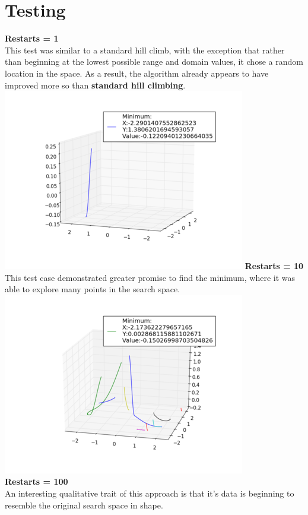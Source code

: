 \documentclass[]{report}
\begin{document}
	\section{Testing}
	\textbf{Restarts = 1}\\
	This test was similar to a standard hill climb, with the exception that rather than beginning at the lowest possible range and domain values, it chose a random location in the space. As a result, the algorithm already appears to have improved more so than \textbf{standard hill climbing}.\\
	\includegraphics{hcr1}\newpage
	\textbf{Restarts = 10}\\
	This test case demonstrated greater promise to find the minimum, where it was able to explore many points in the search space.\\
	\includegraphics{hcr10}\\
	\textbf{Restarts = 100}\\
	An interesting qualitative trait of this approach is that it's data is beginning to resemble the original search space in shape.\\
\end{document}

